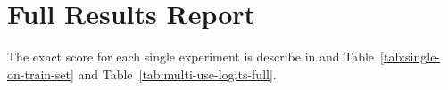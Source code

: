 \documentclass[11pt,a4paper]{article}
\begin{document}
\section{Full Results Report}
\label{apx:full-results-report}
The exact score for each single experiment is describe in and Table~\ref{tab:single-on-train-set} and Table~\ref{tab:multi-use-logits-full}.


%
\end{document}
